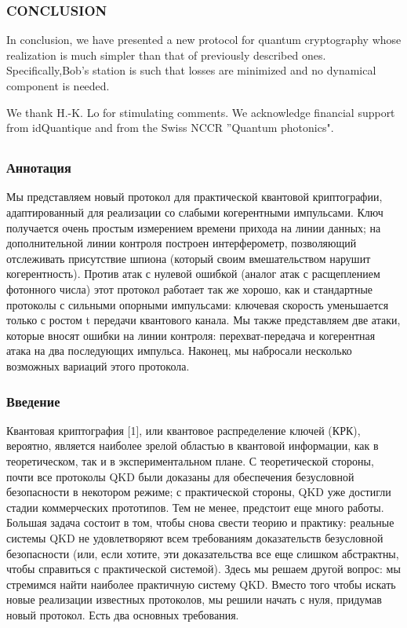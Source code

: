 \subsubsection{CONCLUSION}

In conclusion, we have presented a new protocol for quantum cryptography whose realization is much simpler than that of previously described ones. Specifically,Bob’s station is such that losses are minimized and no dynamical component is needed.

We thank H.-K. Lo for stimulating comments. We acknowledge financial support from idQuantique and from the Swiss NCCR ”Quantum photonics".

\subsection{\trnas}

\subsubsection*{Аннотация}

Мы представляем новый протокол для практической квантовой криптографии, адаптированный для реализации со слабыми когерентными импульсами. Ключ получается очень простым измерением времени прихода на линии данных; на дополнительной линии контроля построен интерферометр, позволяющий отслеживать присутствие шпиона (который своим вмешательством нарушит когерентность). Против атак с нулевой ошибкой (аналог атак с расщеплением фотонного числа) этот протокол работает так же хорошо, как и стандартные протоколы с сильными опорными импульсами: ключевая скорость уменьшается только с ростом t передачи квантового канала. Мы также представляем две атаки, которые вносят ошибки на линии контроля: перехват-передача и когерентная атака на два последующих импульса. Наконец, мы набросали несколько возможных вариаций этого протокола.

\subsubsection{Введение}

Квантовая криптография [1], или квантовое распределение ключей (КРК), вероятно, является наиболее зрелой областью в квантовой информации, как в теоретическом, так и в экспериментальном плане. С теоретической стороны, почти все протоколы QKD были доказаны для обеспечения безусловной безопасности в некотором режиме; с практической стороны, QKD уже достигли стадии коммерческих прототипов. Тем не менее, предстоит еще много работы. Большая задача состоит в том, чтобы снова свести теорию и практику: реальные системы QKD не удовлетворяют всем требованиям доказательств безусловной безопасности (или, если хотите, эти доказательства все еще слишком абстрактны, чтобы справиться с практической системой). Здесь мы решаем другой вопрос: мы стремимся найти наиболее практичную систему QKD. Вместо того чтобы искать новые реализации известных протоколов, мы решили начать с нуля, придумав новый протокол. Есть два основных требования.

